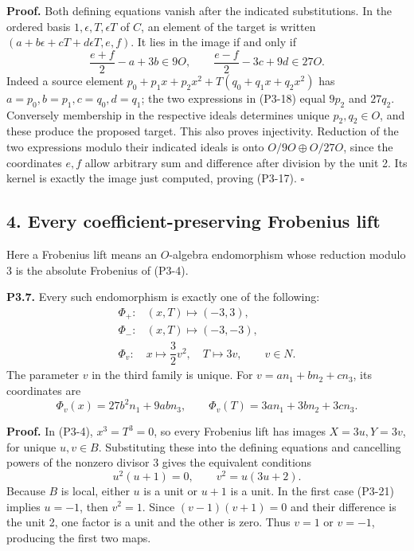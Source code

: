 \documentclass[
]{article}
\begin{document}
\textbf{Proof.} Both defining equations vanish after the indicated
substitutions. In the ordered basis \(1,\epsilon,T,\epsilon T\) of
\(C\), an element of the target is written
\((a+b\epsilon+cT+d\epsilon T,e,f)\). It lies in the image if and only
if \[
\frac{e+f}{2}-a+3b\in9O,\qquad
\frac{e-f}{2}-3c+9d\in27O.
\tag{P3-18}
\] Indeed a source element \(p_0+p_1x+p_2x^2+T(q_0+q_1x+q_2x^2)\) has
\(a=p_0,b=p_1,c=q_0,d=q_1\); the two expressions in (P3-18) equal
\(9p_2\) and \(27q_2\). Conversely membership in the respective ideals
determines unique \(p_2,q_2\in O\), and these produce the proposed
target. This also proves injectivity. Reduction of the two expressions
modulo their indicated ideals is onto \(O/9O\oplus O/27O\), since the
coordinates \(e,f\) allow arbitrary sum and difference after division by
the unit 2. Its kernel is exactly the image just computed, proving
(P3-17). \(\square\)

\subsection{4. Every coefficient-preserving Frobenius
lift}\label{every-coefficient-preserving-frobenius-lift}

Here a Frobenius lift means an \(O\)-algebra endomorphism whose
reduction modulo 3 is the absolute Frobenius of (P3-4).

\textbf{P3.7.} Every such endomorphism is exactly one of the following:
\[
\begin{array}{ll}
\Phi_+:&(x,T)\longmapsto(-3,3),\\
\Phi_-:&(x,T)\longmapsto(-3,-3),\\
\Phi_v:&x\longmapsto\dfrac32v^2,\quad T\longmapsto3v,
\qquad v\in N.
\end{array}
\tag{P3-19}
\] The parameter \(v\) in the third family is unique. For
\(v=an_1+bn_2+cn_3\), its coordinates are \[
\Phi_v(x)=27b^2n_1+9abn_3,\qquad
\Phi_v(T)=3an_1+3bn_2+3cn_3.
\tag{P3-20}
\]

\textbf{Proof.} In (P3-4), \(x^3=T^3=0\), so every Frobenius lift has
images \(X=3u,Y=3v\), for unique \(u,v\in B\). Substituting these into
the defining equations and cancelling powers of the nonzero divisor 3
gives the equivalent conditions \[
u^2(u+1)=0,\qquad v^2=u(3u+2).
\tag{P3-21}
\] Because \(B\) is local, either \(u\) is a unit or \(u+1\) is a unit.
In the first case (P3-21) implies \(u=-1\), then \(v^2=1\). Since
\((v-1)(v+1)=0\) and their difference is the unit 2, one factor is a
unit and the other is zero. Thus \(v=1\) or \(v=-1\), producing the
first two maps.
\end{document}
